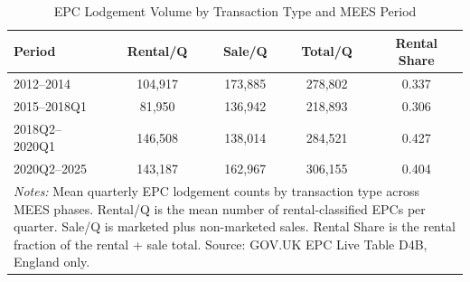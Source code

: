 \begin{table}[t]
\centering
\caption{EPC Lodgement Volume by Transaction Type and MEES Period}
\label{tab:surge}
\small
\begin{tabular}{lcccc}
\hline\hline
Period & Rental/Q & Sale/Q & Total/Q & Rental Share \\
\hline
2012--2014 & 104,917 & 173,885 & 278,802 & 0.337 \\
2015--2018Q1 & 81,950 & 136,942 & 218,893 & 0.306 \\
2018Q2--2020Q1 & 146,508 & 138,014 & 284,521 & 0.427 \\
2020Q2--2025 & 143,187 & 162,967 & 306,155 & 0.404 \\
\hline\hline
\multicolumn{5}{p{0.95\textwidth}}{\scriptsize \textit{Notes:}  Mean quarterly EPC lodgement counts by transaction type across MEES phases.  Rental/Q is the mean number of rental-classified EPCs per quarter. Sale/Q is  marketed plus non-marketed sales. Rental Share is the rental fraction of the  rental + sale total. Source: GOV.UK EPC Live Table D4B, England only.}
\end{tabular}
\end{table}
